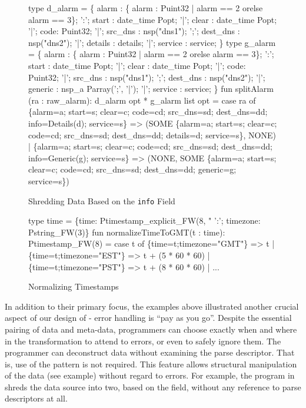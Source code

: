 \documentclass{entcs}
\begin{document}
\begin{figure}
  \centering
  \begin{code}
type d_alarm = \{
       alarm    :  \{ alarm : Puint32 | alarm == 2 
                                        orelse alarm == 3\};
 ':';  start :  date_time Popt;
 '|';  clear :  date_time Popt;
 '|';  code: Puint32;
 '|';  src_dns  :  nsp("dns1");
 ';';  dest_dns :  nsp("dns2");
 '|';  details  : details;
 '|';  service  :  service;
\}
\mbox{}
type g_alarm = \{
       alarm    :  \{ alarm : Puint32 | alarm == 2 
                                        orelse alarm == 3\};
 ':';  start :  date_time Popt;
 '|';  clear :  date_time Popt;
 '|';  code: Puint32;
 '|';  src_dns  :  nsp("dns1");
 ';';  dest_dns :  nsp("dns2");
 '|';  generic  : nsp_a Parray(';', '|');
 '|';  service  :  service;
\}
\mbox{}
fun splitAlarm (ra : raw_alarm): 
    d_alarm opt * g_alarm list opt
  = case ra of
        \{alarm=a; start=s; clear=c; code=cd; 
         src_dns=sd; dest_dns=dd; 
         info=Details(d); service=s\} 
        => 
        (SOME \{alarm=a; start=s; clear=c; 
               code=cd; src_dns=sd; dest_dns=dd; 
               details=d; service=s\}, 
         NONE)
      | \{alarm=a; start=s; clear=c; code=cd; 
         src_dns=sd; dest_dns=dd; 
         info=Generic(g); service=s\} 
        => 
        (NONE,
         SOME \{alarm=a; start=s; clear=c; 
               code=cd; src_dns=sd; dest_dns=dd; 
               generic=g; service=s\})    
  \end{code}
  \label{fig:ex-no-err-check}
  \caption{Shredding \darkstar{} Data Based on the {\tt info} Field}
\end{figure}

\begin{figure}
  \centering
  \begin{code}
type time = 
  \{time: Ptimestamp_explicit_FW(8, "%
   ':'; timezone: Pstring_FW(3)\}
\mbox{}
fun normalizeTimeToGMT(t : time): Ptimestamp_FW(8) =
    case t of
      \{time=t;timezone="GMT"\} => t
    | \{time=t;timezone="EST"\} => t + (5 * 60 * 60)
    | \{time=t;timezone="PST"\} => t + (8 * 60 * 60)
    | ...    
  \end{code}
  \caption{Normalizing Timestamps}
  \label{fig:ex-normalize}
\end{figure}

In addition to their primary focus, the examples above illustrated
another crucial aspect of our design of \datatype{} - error handling
is ``pay as you go''.  Despite the essential pairing of data and
meta-data, programmers can choose exactly when and where in the
transformation to attend to errors, or even to safely ignore them. The
programmer can deconstruct data without examining the parse
descriptor. That is, use of the pattern  is not
required. This feature allows structural manipulation of the data (see
\darkstar{} example) without regard to errors. For example, the
program in  shreds the \darkstar{} data
source into two, based on the  field, without any reference to
parse descriptors at all.
\end{document}
